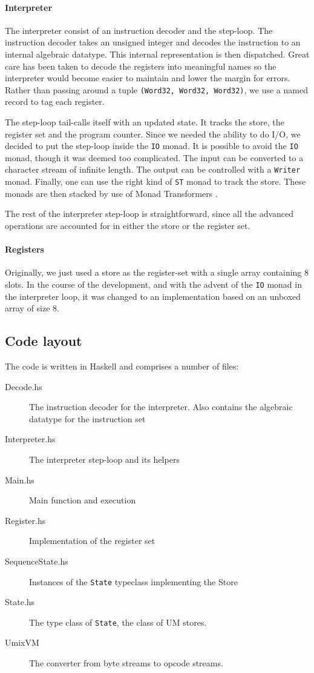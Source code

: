 \paragraph{Interpreter}
\label{sec:interpreter}

The interpreter consist of an instruction decoder and the
step-loop. The instruction decoder takes an unsigned integer and
decodes the instruction to an internal algebraic datatype. This
internal representation is then dispatched. Great care has been taken to
decode the registers into meaningful names so the interpreter would
become easier to maintain and lower the margin for errors. Rather than
passing around a tuple \texttt{(Word32, Word32, Word32)}, we use a
named record to tag each register.

The step-loop tail-calls itself with an updated state. It tracks the
store, the register set and the program counter. Since we needed the
ability to do I/O, we decided to put the step-loop inside the
\texttt{IO} monad. It is possible to avoid the \texttt{IO}
monad, though it was deemed too complicated. The input can be
converted to a character stream of infinite length. The output can be
controlled with a \texttt{Writer} monad. Finally, one can use the
right kind of \texttt{ST} monad to track the store. These monads are
then stacked by use of Monad Transformers \cite{monad+transformer}.

The rest of the interpreter step-loop is straightforward, since all
the advanced operations are accounted for in either the store or the
register set.

\paragraph{Registers}
\label{sec:registers}

Originally, we just used a store as the register-set with a single
array containing 8 slots. In the course of the development, and with
the advent of the \texttt{IO} monad in the interpreter loop, it was
changed to an implementation based on an unboxed array of size 8.

\subsection*{Code layout}

The code is written in Haskell and comprises a number of files:
\begin{description}
\item[Decode.hs] The instruction decoder for the interpreter. Also
  contains the algebraic datatype for the instruction set
\item[Interpreter.hs] The interpreter step-loop and its helpers
\item[Main.hs] Main function and execution
\item[Register.hs] Implementation of the register set
\item[SequenceState.hs] Instances of the \texttt{State} typeclass
  implementing the Store
\item[State.hs] The type class of \texttt{State}, the class of UM stores.
\item[UmixVM] The converter from byte streams to opcode streams.
\end{description}
